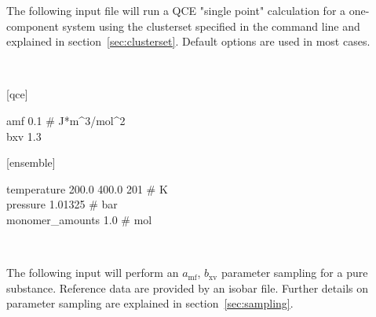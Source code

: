 \documentclass{scrartcl}
\newcommand{\amf}{a_\mathrm{mf}}
\newcommand{\bxv}{b_\mathrm{xv}}
\begin{document}
The following input file will run a QCE "single point" calculation for a one-component system using the clusterset specified in the command line and explained in section~\vref{sec:clusterset}.
Default options are used in most cases.

\

\begin{addmargin}[1cm]{0cm}
    \ttfamily
    \begin{minipage}{\textwidth}
        [qce]
        \begin{addmargin}[1cm]{0cm}
            amf 0.1 \# J*m\^{}3/mol\^{}2 \\
            bxv 1.3
        \end{addmargin}
    \end{minipage}

    \begin{minipage}{\textwidth}
        [ensemble]
        \begin{addmargin}[1cm]{0cm}
            temperature 200.0 400.0 201 \# K \\
            pressure 1.01325 \# bar \\
            monomer\_amounts 1.0 \# mol
        \end{addmargin}
    \end{minipage}
\end{addmargin}

\

The following input will perform an $\amf$, $\bxv$ parameter sampling for a pure substance.
Reference data are provided by an isobar file.
Further details on parameter sampling are explained in section~\vref{sec:sampling}.

\
\end{document}
